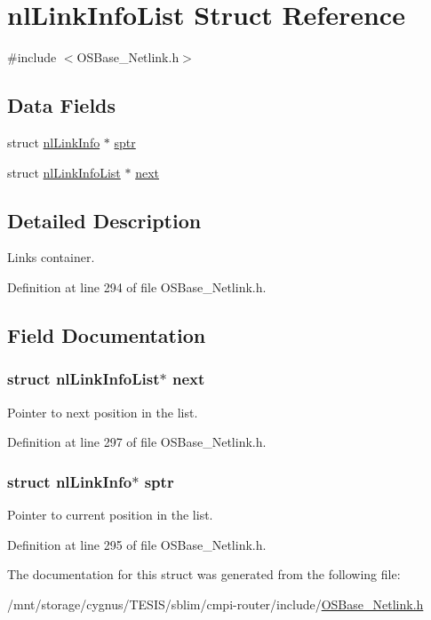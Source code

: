 \hypertarget{structnl_link_info_list}{
\section{nlLinkInfoList Struct Reference}
\label{structnl_link_info_list}
}


{\ttfamily \#include $<$OSBase\_\-Netlink.h$>$}\subsection*{Data Fields}
\begin{DoxyCompactItemize}
\item 
struct \hyperlink{structnl_link_info}{nlLinkInfo} $\ast$ \hyperlink{structnl_link_info_list_a7956ff417c4ef804785519e651457d89}{sptr}
\item 
struct \hyperlink{structnl_link_info_list}{nlLinkInfoList} $\ast$ \hyperlink{structnl_link_info_list_a38363837a3f5f555e8f3a772b93986bb}{next}
\end{DoxyCompactItemize}


\subsection{Detailed Description}
Links container. 

Definition at line 294 of file OSBase\_\-Netlink.h.

\subsection{Field Documentation}
\hypertarget{structnl_link_info_list_a38363837a3f5f555e8f3a772b93986bb}{
\subsubsection[{next}]{\setlength{\rightskip}{0pt plus 5cm}struct {\bf nlLinkInfoList}$\ast$ {\bf next}}}
\label{structnl_link_info_list_a38363837a3f5f555e8f3a772b93986bb}
Pointer to next position in the list. 

Definition at line 297 of file OSBase\_\-Netlink.h.\hypertarget{structnl_link_info_list_a7956ff417c4ef804785519e651457d89}{
\subsubsection[{sptr}]{\setlength{\rightskip}{0pt plus 5cm}struct {\bf nlLinkInfo}$\ast$ {\bf sptr}}}
\label{structnl_link_info_list_a7956ff417c4ef804785519e651457d89}
Pointer to current position in the list. 

Definition at line 295 of file OSBase\_\-Netlink.h.

The documentation for this struct was generated from the following file:\begin{DoxyCompactItemize}
\item 
/mnt/storage/cygnus/TESIS/sblim/cmpi-\/router/include/\hyperlink{_o_s_base___netlink_8h}{OSBase\_\-Netlink.h}\end{DoxyCompactItemize}
